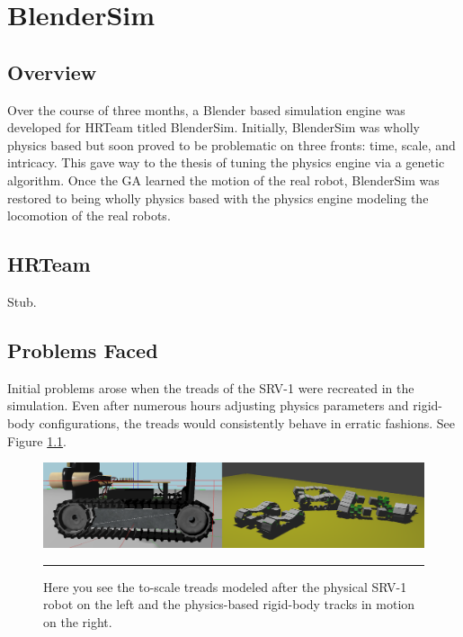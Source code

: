 \chapter{BlenderSim}

\label{Chapter5}

\section{Overview}


Over the course of three months, a Blender based simulation engine was developed for HRTeam titled BlenderSim. Initially, BlenderSim was wholly physics based but soon proved to be problematic on three fronts: time, scale, and intricacy. This gave way to the thesis of tuning the physics engine via a genetic algorithm. Once the GA learned the motion of the real robot, BlenderSim was restored to being wholly physics based with the physics engine modeling the locomotion of the real robots.

\section{HRTeam}

Stub.

\section{Problems Faced}

Initial problems arose when the treads of the SRV-1 were recreated in the simulation. Even after numerous hours adjusting physics parameters and rigid-body configurations, the treads would consistently behave in erratic fashions. See Figure \ref{treads}.

\begin{figure}[htbp]
\centering
\includegraphics[scale=0.25]{../Figures/Chapter5/treads.png}
\rule{35em}{0.5pt}
\caption[Simulated Treads]{Here you see the to-scale treads modeled after the physical SRV-1 robot on the left and the physics-based rigid-body tracks in motion on the right.}
\label{treads}
\end{figure}

